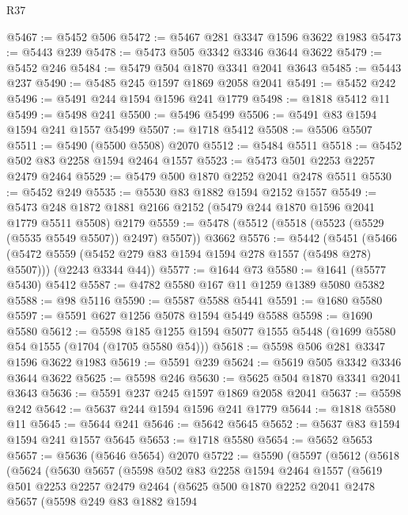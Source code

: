 \begin{lexlean}{R37}
\begin{coremodule}
@5467 := @5452 @506
@5472 := @5467 @281 @3347 @1596 @3622 @1983
@5473 := @5443 @239
@5478 := @5473 @505 @3342 @3346 @3644 @3622
@5479 := @5452 @246
@5484 := @5479 @504 @1870 @3341 @2041 @3643
@5485 := @5443 @237
@5490 := @5485 @245 @1597 @1869 @2058 @2041
@5491 := @5452 @242
@5496 := @5491 @244 @1594 @1596 @241 @1779
@5498 := @1818 @5412 @11
@5499 := @5498 @241
@5500 := @5496 @5499
@5506 := @5491 @83 @1594 @1594 @241 @1557 @5499
@5507 := @1718 @5412
@5508 := @5506 @5507
@5511 := @5490 (@5500 @5508) @2070
@5512 := @5484 @5511
@5518 := @5452 @502 @83 @2258 @1594 @2464 @1557
@5523 := @5473 @501 @2253 @2257 @2479 @2464
@5529 := @5479 @500 @1870 @2252 @2041 @2478 @5511
@5530 := @5452 @249
@5535 := @5530 @83 @1882 @1594 @2152 @1557
@5549 := @5473 @248 @1872 @1881 @2166 @2152 (@5479 @244 @1870 @1596 @2041 @1779 @5511 @5508) @2179
@5559 := @5478 (@5512 (@5518 (@5523 (@5529 (@5535 @5549 @5507)) @2497) @5507)) @3662
@5576 := @5442
    (@5451
      (@5466 (@5472 @5559 (@5452 @279 @83 @1594 @1594 @278 @1557 (@5498 @278) @5507)))
      (@2243 @3344 @44))
@5577 := @1644 @73
@5580 := @1641 (@5577 @5430) @5412
@5587 := @4782 @5580 @167 @11 @1259 @1389 @5080 @5382
@5588 := @98 @5116
@5590 := @5587 @5588 @5441
@5591 := @1680 @5580
@5597 := @5591 @627 @1256 @5078 @1594 @5449 @5588
@5598 := @1690 @5580
@5612 := @5598 @185 @1255 @1594 @5077 @1555 @5448 (@1699 @5580 @54 @1555 (@1704 (@1705 @5580 @54)))
@5618 := @5598 @506 @281 @3347 @1596 @3622 @1983
@5619 := @5591 @239
@5624 := @5619 @505 @3342 @3346 @3644 @3622
@5625 := @5598 @246
@5630 := @5625 @504 @1870 @3341 @2041 @3643
@5636 := @5591 @237 @245 @1597 @1869 @2058 @2041
@5637 := @5598 @242
@5642 := @5637 @244 @1594 @1596 @241 @1779
@5644 := @1818 @5580 @11
@5645 := @5644 @241
@5646 := @5642 @5645
@5652 := @5637 @83 @1594 @1594 @241 @1557 @5645
@5653 := @1718 @5580
@5654 := @5652 @5653
@5657 := @5636 (@5646 @5654) @2070
@5722 := @5590
    (@5597
      (@5612
        (@5618
          (@5624
            (@5630
              @5657
              (@5598
                @502
                @83
                @2258
                @1594
                @2464
                @1557
                (@5619
                  @501
                  @2253
                  @2257
                  @2479
                  @2464
                  (@5625
                    @500
                    @1870
                    @2252
                    @2041
                    @2478
                    @5657
                    (@5598
                      @249
                      @83
                      @1882
                      @1594

\end{coremodule}
\end{lexlean}
